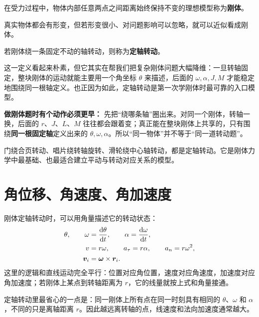 \documentclass[lang=cn,11pt]{elegantbook}
\newcommand{\bridge}[1]{\begin{note}#1\end{note}}
\begin{document}
\begin{definition}[刚体]\label{def:rigid-body}
在受力过程中，物体内部任意两点之间距离始终保持不变的理想模型称为\textbf{刚体}。
\end{definition}

真实物体都会有形变，但若形变很小、对问题影响可以忽略，就可以近似看成刚体。

\begin{definition}[定轴转动]\label{def:fixed-axis-rotation}
若刚体绕一条固定不动的轴转动，则称为\textbf{定轴转动}。
\end{definition}

\begin{note}
这一定义看起来朴素，但它其实在帮我们把复杂刚体问题大幅降维：一旦转轴固定，整块刚体的运动就能主要用一个角坐标 \(\theta\) 来描述，后面的 \(\omega,\alpha,J,M\) 才能稳定地围绕同一根轴定义。也正因为如此，定轴转动是第一次学刚体时最可靠的入口模型。
\end{note}

\begin{note}
\textbf{做刚体题时有个动作必须更早：} 先把“绕哪条轴”圈出来。对同一个刚体，转轴一换，后面的 \(r\)、\(J\)、\(L\)、\(M\) 往往都会跟着变；真正能在整块刚体上共享的，只有围绕\textbf{同一根固定轴}定义出来的 \(\theta,\omega,\alpha\)。所以“同一物体”并不等于“同一道转动题”。
\end{note}

门绕合页转动、唱片绕转轴旋转、滑轮绕中心轴转动，都是定轴转动。它是刚体力学中最基础、也最适合建立平动与转动对应关系的模型。

\section{角位移、角速度、角加速度}

刚体定轴转动时，可以用角量描述它的转动状态：
\[
\begin{aligned}
\theta,\qquad \omega&=\dv{\theta}{t},\qquad \alpha=\dv{\omega}{t},\\
v&=r\omega,\qquad a_\tau=r\alpha,\qquad a_n=r\omega^2,\\
\vb*{v}_i&=\vb*{\omega}\times \vb*{r}_i.
\end{aligned}
\]
这里的逻辑和直线运动完全平行：位置对应角位置，速度对应角速度，加速度对应角加速度；若刚体上某点到转轴距离为 \(r\)，它的线量就按上式和角量接通。

\bridge{定轴转动里最省心的一点是：同一刚体上所有点在同一时刻具有相同的 \(\theta\)、\(\omega\) 和 \(\alpha\)，不同的只是离轴距离 \(r\)。因此越远离转轴的点，线速度和法向加速度通常越大。}
\end{document}
